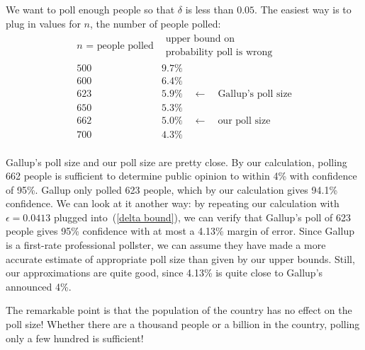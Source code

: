\documentclass[11pt,twoside]{article}
\begin{document}
We want to poll enough people so that $\delta$ is less than $0.05$.
The easiest way is to plug in values for $n$, the number of people
polled:
\[
\begin{array}{c|l}
\mbox{$n$ = people polled} & \begin{array}{cc}
\mbox{upper bound on} \\
\mbox{probability poll is wrong}
\end{array} \\
\hline
500 &  9.7\% \\
600 &  6.4\% \\
623 &  5.9\% \quad \leftarrow \quad \mbox{Gallup's poll size} \\
650 &  5.3\% \\
662 &  5.0\% \quad \leftarrow \quad \mbox{our poll size} \\
700 &  4.3\% \\
\end{array}
\]

Gallup's poll size and our poll size are pretty close.  By our
calculation, polling 662 people is sufficient to determine public opinion
to within 4\% with confidence of 95\%.  Gallup only polled 623 people,
which by our calculation gives 94.1\% confidence.  We can look at it
another way: by repeating our calculation with $\epsilon = 0.0413$ plugged
into~(\ref{delta bound}), we can verify that Gallup's poll of 623 people
gives 95\% confidence with at most a 4.13\% margin of error.  Since Gallup
is a first-rate professional pollster, we can assume they have made a more
accurate estimate of appropriate poll size than given by our upper bounds.
Still, our approximations are quite good, since 4.13\% is quite close to
Gallup's announced 4\%.

The remarkable point is that the population of the country has no
effect on the poll size!  Whether there are a thousand people or a
billion in the country, polling only a few hundred is sufficient!
\fi

\end{document}
